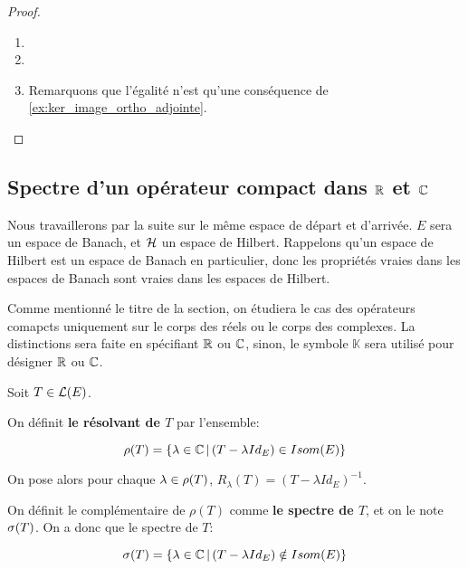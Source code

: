\begin{proof}
	\begin{enumerate}
		\item

		\item

		\item Remarquons que l'égalité n'est qu'une conséquence de
			\ref{ex:ker_image_ortho_adjointe}.
	\end{enumerate}
\end{proof}



	

\subsection{Spectre d'un opérateur compact dans $\mathbb{R}$ et $\mathbb{C}$}

Nous travaillerons par la suite sur le même espace de départ et d'arrivée. $E$
sera un espace de Banach, et $\mathcal{H}$ un espace de Hilbert.
Rappelons qu'un espace de Hilbert est un espace de Banach en particulier, donc
les propriétés vraies dans les espaces de Banach sont vraies dans les espaces de
Hilbert.

Comme mentionné le titre de la section, on étudiera le cas des opérateurs
comapcts uniquement sur le corps des réels ou le corps des complexes. La
distinctions sera faite en spécifiant $\mathbb{R}$ ou $\mathbb{C}$, sinon, le symbole
$\mathbb{K}$ sera utilisé pour désigner $\mathbb{R}$ ou $\mathbb{C}$.

\begin{definition}
	Soit $T \in \mathcal{L}(E)$.

	On définit \textbf{le résolvant de $T$} par l'ensemble:

	\begin{equation}
		\rho(T) = \left\{\lambda \in \mathbb{C} \, | \, (T - \lambda
			{Id}_{E}) \in Isom(E) \right\}
			\label{def:resolvant_operator}
	\end{equation}

	On pose alors pour chaque $\lambda \in \rho(T)$, $R_{\lambda}(T) = (T -
	\lambda Id_{E})^{-1}$.

	On définit le complémentaire de $\rho(T)$ comme \textbf{le spectre de $T$},
	et on le note $\sigma(T)$.
	On a donc que le spectre de $T$:

	\begin{equation}
		\sigma(T) = \left\{\lambda \in \mathbb{C} \, | \, (T - \lambda {Id}_{E})
		\notin Isom(E) \right\}
		\label{def:spectrum_operator}
	\end{equation}
\end{definition}

